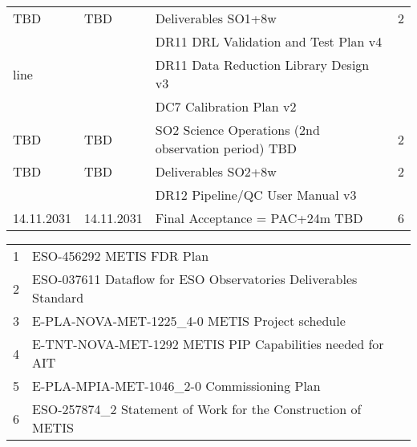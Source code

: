 \begin{table}
\begin{tabularx}{\textwidth}{llll}
\hline
TBD        &	TBD        &	Deliverables SO1+8w                                         &	2 \\
	   &		   &	DR11 DRL Validation and Test Plan v4			    &	\\
line	   &		   &	DR11 Data Reduction Library Design v3			    &	\\
	   &		   &	DC7 Calibration Plan v2					    &	\\
\hline
TBD        &	TBD        &	SO2 Science Operations (2nd observation period) TBD	    &	2 \\
\hline
TBD        &	TBD        &	Deliverables SO2+8w                                         &	2 \\
	   &		   &	DR12 Pipeline/QC User Manual v3				    &	\\
\hline
14.11.2031 &	14.11.2031 &	Final Acceptance  = PAC+24m  TBD			    &	6 \\
\hline\hline
\end{tabularx}			
\tiny
\begin{tabularx}{\textwidth}{ll}
1 & ESO-456292 METIS FDR Plan  \\
2 & ESO-037611 Dataflow for ESO Observatories Deliverables Standard \\
3 & E-PLA-NOVA-MET-1225_4-0 METIS Project schedule \\
4 & E-TNT-NOVA-MET-1292 METIS PIP Capabilities needed for AIT \\ 
5 & E-PLA-MPIA-MET-1046_2-0 Commissioning Plan \\
6 & ESO-257874_2 Statement of Work for the Construction of METIS \\
\end{tabularx} 




\end{table}
